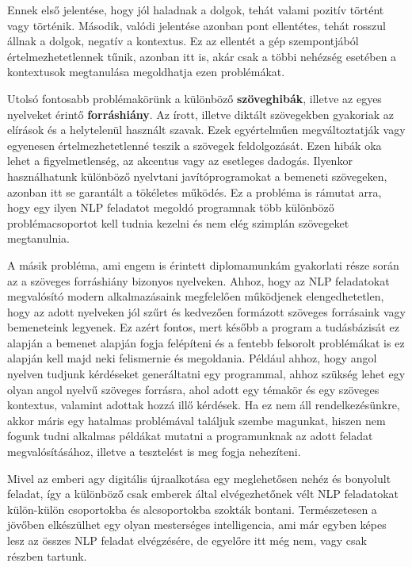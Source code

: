 Ennek első jelentése, hogy jól haladnak a dolgok, tehát valami pozitív történt vagy történik. Második, valódi jelentése azonban pont ellentétes, tehát rosszul állnak a dolgok, negatív a kontextus. Ez az ellentét a gép szempontjából értelmezhetetlennek tűnik, azonban itt is, akár csak a többi nehézség esetében a kontextusok megtanulása megoldhatja ezen problémákat.

Utolsó fontosabb problémakörünk a különböző \textbf{szöveghibák}, illetve az egyes nyelveket érintő \textbf{forráshiány}. Az írott, illetve diktált szövegekben gyakoriak az elírások és a helytelenül használt szavak. Ezek egyértelműen megváltoztatják vagy egyenesen értelmezhetetlenné teszik a szövegek feldolgozását. Ezen hibák oka lehet a figyelmetlenség, az akcentus vagy az esetleges dadogás. Ilyenkor használhatunk különböző nyelvtani javítóprogramokat a bemeneti szövegeken, azonban itt se garantált a tökéletes működés. Ez a probléma is rámutat arra, hogy egy ilyen NLP feladatot megoldó programnak több különböző problémacsoportot kell tudnia kezelni és nem elég szimplán szövegeket megtanulnia.

A másik probléma, ami engem is érintett diplomamunkám gyakorlati része során az a szöveges forráshiány bizonyos nyelveken. Ahhoz, hogy az NLP feladatokat megvalósító modern alkalmazásaink megfelelően működjenek elengedhetetlen, hogy az adott nyelveken jól szűrt és kedvezően formázott szöveges forrásaink vagy bemeneteink legyenek. Ez azért fontos, mert később a program a tudásbázisát ez alapján a bemenet alapján fogja felépíteni és a fentebb felsorolt problémákat is ez alapján kell majd neki felismernie és megoldania. Például ahhoz, hogy angol nyelven tudjunk kérdéseket generáltatni egy programmal, ahhoz szükség lehet egy olyan angol nyelvű szöveges forrásra, ahol adott egy témakör és egy szöveges kontextus, valamint adottak hozzá illő kérdések. Ha ez nem áll rendelkezésünkre, akkor máris egy hatalmas problémával találjuk szembe magunkat, hiszen nem fogunk tudni alkalmas példákat mutatni a programunknak az adott feladat megvalósításához, illetve a tesztelést is meg fogja nehezíteni.


Mivel az emberi agy digitális újraalkotása egy meglehetősen nehéz és bonyolult feladat, így a különböző csak emberek által elvégezhetőnek vélt NLP feladatokat külön-külön csoportokba és alcsoportokba szokták bontani. Természetesen a jövőben elkészülhet egy olyan mesterséges intelligencia, ami már egyben képes lesz az összes NLP feladat elvégzésére, de egyelőre itt még nem, vagy csak részben tartunk.

